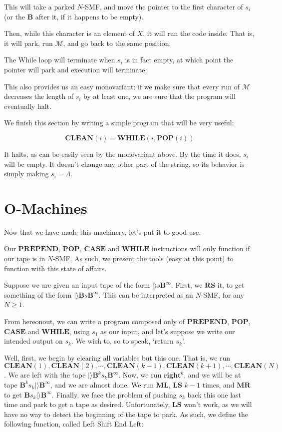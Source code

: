 \documentclass{article}
\newcommand{\B}{\mathbf{B}}
\newcommand{\M}{\mathcal{M}}
\newcommand{\MR}{\mathbf{MR}}
\newcommand{\ML}{\mathbf{ML}}
\newcommand{\RS}{\mathbf{RS}}
\newcommand{\LS}{\mathbf{LS}}
\newcommand{\Oright}{\mathbf{right}}
\newcommand{\PREPEND}{\mathbf{PREPEND}}
\newcommand{\POP}{\mathbf{POP}}
\newcommand{\CASE}{\mathbf{CASE}}
\newcommand{\WHILE}{\mathbf{WHILE}}
\newcommand{\CLEAN}{\mathbf{CLEAN}}
\begin{document}
	This will take a parked $N$-SMF, and move the pointer to the first character of $s_i$ (or the $\B$ after it, if it happens to be empty).
	
	Then, while this character is an element of $X$, it will run the code inside. That is, it will park, run $\M$, and go back to the same position.
	
	The While loop will terminate when $s_i$ is in fact empty, at which point the pointer will park and execution will terminate.
	
	This also provides us an easy monovariant: if we make sure that every run of $\M$ decreases the length of $s_i$ by at least one, we are sure that the program will eventually halt.
	
	We finish this section by writing a simple program that will be very useful:
	
	\[\CLEAN(i) = \WHILE(i, \POP(i))\]
	
	It halts, as can be easily seen by the monovariant above. By the time it does, $s_i$ will be empty. It doesn't change any other part of the string, so its behavior is simply making $s_i = \Lambda$.
	
	\section{O-Machines}
	
	Now that we have made this machinery, let's put it to good use.
	
	Our $\PREPEND$, $\POP$, $\CASE$ and $\WHILE$ instructions will only function if our tape is in $N$-SMF. As such, we present the tools (easy at this point) to function with this state of affairs.
	
	Suppose we are given an input tape of the form $|\rangle s \B^\infty$. First, we $\RS$ it, to get something of the form $|\rangle \B s \B^\infty$. This can be interpreted as an $N$-SMF, for any $N \geq 1$.
	
	From hereonout, we can write a program composed only of $\PREPEND$, $\POP$, $\CASE$ and $\WHILE$, using $s_1$ as our input, and let's suppose we write our intended output on $s_k$. We wish to, so to speak, `return $s_k$'.
	
	Well, first, we begin by clearing all variables but this one. That is, we run $\CLEAN(1), \CLEAN(2), \cdots, \CLEAN(k-1), \CLEAN(k+1), \cdots, \CLEAN(N)$. We are left with the tape $|\rangle \B^k s_k \B^\infty$. Now, we run $\Oright^{k}$, and we will be at tape $\B^k s_k |\rangle \B^\infty$, and we are almost done. We run $\ML$, $\LS$ $k-1$ times, and $\MR$ to get $\B s_k |\rangle \B^\infty$. Finally, we face the problem of pushing $s_k$ back this one last time and park to get a tape as desired. Unfortunately, $\LS$ won't work, as we will have no way to detect the beginning of the tape to park. As such, we define the following function, called Left Shift End Left:
	
\end{document}
